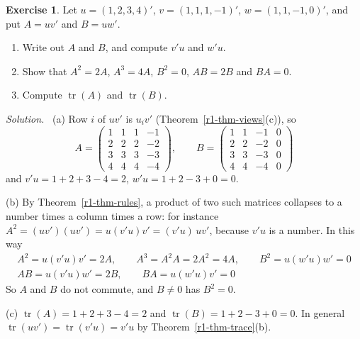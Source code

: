 \documentclass[12pt]{article}
\DeclareMathOperator{\tr}{tr}
\theoremstyle{definition}
\newtheorem{exercise}{Exercise}
\newenvironment{solution}{\par\noindent\textit{Solution.}\ }{\par\smallskip}
\begin{document}
\begin{exercise}\label{r1-ex-outer}
Let \(u=(1,2,3,4)'\), \(v=(1,1,1,-1)'\), \(w=(1,1,-1,0)'\), and put \(A=uv'\) and
\(B=uw'\).
\begin{enumerate}
\item Write out \(A\) and \(B\), and compute \(v'u\) and \(w'u\).
\item Show that \(A^2=2A\), \(A^3=4A\), \(B^2=0\), \(AB=2B\) and \(BA=0\).
\item Compute \(\tr(A)\) and \(\tr(B)\).
\end{enumerate}
\end{exercise}
\begin{solution}
(a) Row \(i\) of \(uv'\) is \(u_iv'\) (Theorem~\ref{r1-thm-views}(c)), so
\[
A=\begin{pmatrix}1&1&1&-1\\2&2&2&-2\\3&3&3&-3\\4&4&4&-4\end{pmatrix},\qquad
B=\begin{pmatrix}1&1&-1&0\\2&2&-2&0\\3&3&-3&0\\4&4&-4&0\end{pmatrix}
\]
and \(v'u=1+2+3-4=2\), \(w'u=1+2-3+0=0\).

(b) By Theorem~\ref{r1-thm-rules}, a product of two such matrices collapses to a number
times a column times a row: for instance \(A^2=(uv')(uv')=u(v'u)v'=(v'u)\,uv'\), because
\(v'u\) is a number. In this way
\[
\begin{gathered}
A^2=u(v'u)v'=2A,\qquad A^3=A^2A=2A^2=4A,\qquad B^2=u(w'u)w'=0\\
AB=u(v'u)w'=2B,\qquad BA=u(w'u)v'=0
\end{gathered}
\]
So \(A\) and \(B\) do not commute, and \(B\ne0\) has \(B^2=0\).

(c) \(\tr(A)=1+2+3-4=2\) and \(\tr(B)=1+2-3+0=0\). In general
\(\tr(uv')=\tr(v'u)=v'u\) by Theorem~\ref{r1-thm-trace}(b).
\end{solution}
\end{document}
